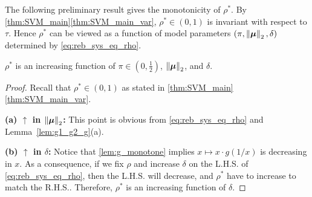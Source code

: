 The following preliminary result gives the monotonicity of $\rho^*$. By \cref{thm:SVM_main}\ref{thm:SVM_main_var}, $\rho^* \in (0, 1)$ is invariant with respect to $\tau$. Hence $\rho^*$ can be viewed as a function of model parameters $(\pi, \left\|{\text{\boldmath $\mu$}}\right\|_2, \delta)$ determined by \cref{eq:reb_sys_eq_rho}.
\begin{lem}\label{lem:rho_mono}
    $\rho^*$ is an increasing function of $\pi \in (0, \frac12)$, $\left\|{\text{\boldmath $\mu$}}\right\|_2$, and $\delta$.
\end{lem}
\begin{proof}
Recall that $\rho^* \in (0, 1)$ as stated in \cref{thm:SVM_main}\ref{thm:SVM_main_var}.

\vspace{0.5\baselineskip}
\noindent
\textbf{(a) $\boldsymbol{\uparrow}$ in $\left\|{{\boldsymbol{\mu}}}\right\|_2$:}
This point is obvious from \cref{eq:reb_sys_eq_rho} and Lemma~\ref{lem:g1_g2_g}(a). 

\vspace{0.5\baselineskip}
\noindent
\textbf{(b) $\boldsymbol{\uparrow}$ in $\delta$:}
Notice that \cref{lem:g_monotone} implies $x \mapsto x \cdot g(1 / x)$ is decreasing in $x$. As a consequence, if we fix $\rho$ and increase $\delta$ on the L.H.S. of \cref{eq:reb_sys_eq_rho}, then the L.H.S. will decrease, and $\rho^*$ have to increase to match the R.H.S.. Therefore, $\rho^*$ is an increasing function of $\delta$. 


\end{proof}
